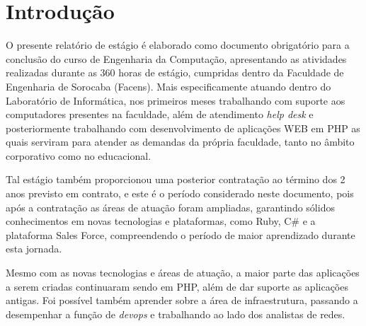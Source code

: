 \documentclass[
	12pt,				%
	oneside,			%
	a4paper,			%
	chapter=TITLE,		%
	section=TITLE,		%
	sumario=tradicional %
	english,			%
	french,				%
	spanish,			%
	brazil				%
	]{abntex2}
\begin{document}
%

%




%



%





\textual
\pagestyle{simple}


\chapter{Introdução}
\label{chap:cap1}
O presente relatório de estágio é elaborado como documento obrigatório para a conclusão do curso de Engenharia da Computação, apresentando as atividades realizadas durante as 360 horas de estágio, cumpridas dentro da Faculdade de Engenharia de Sorocaba (Facens). Mais especificamente atuando dentro do Laboratório de Informática, nos primeiros meses trabalhando com suporte aos computadores presentes na faculdade, além de atendimento \textit{help desk} e posteriormente trabalhando com desenvolvimento de aplicações WEB em PHP as quais serviram para atender as demandas da própria faculdade, tanto no âmbito corporativo como no educacional.

Tal estágio também proporcionou uma posterior contratação ao término dos 2 anos previsto em contrato, e este é o período considerado neste documento, pois após a contratação as áreas de atuação foram ampliadas, garantindo sólidos conhecimentos em novas tecnologias e plataformas, como Ruby, C\# e a plataforma Sales Force, compreendendo o período de maior aprendizado durante esta jornada. 

Mesmo com as novas tecnologias e áreas de atuação, a maior parte das aplicações a serem criadas continuaram sendo em PHP, além de dar suporte as aplicações antigas. Foi possível também aprender sobre a área de infraestrutura, passando a desempenhar a função de \textit{devops} e trabalhando ao lado dos analistas de redes.
\end{document}
